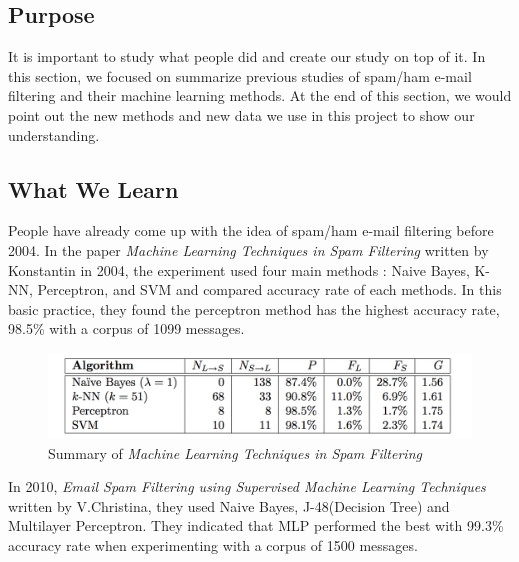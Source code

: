 
\subsection{Purpose}

It is important to study what people did and create our study on top of it. In this section, we focused on summarize previous studies of spam/ham e-mail filtering and their machine learning methods. At the end of this section, we would point out the new methods and new data we use in this project to show our understanding.  \\

\subsection{What We Learn}
People have already come up with the idea of spam/ham e-mail filtering before 2004. In the paper \textit{Machine Learning Techniques in Spam Filtering} written by Konstantin in 2004\cite{MLinspam}, the experiment used four main methods : Naive Bayes, K-NN, Perceptron, and SVM and compared accuracy rate of each methods. In this basic practice, they found the perceptron method has the highest accuracy rate, 98.5\% with a corpus of 1099 messages. \\

\begin{figure}[H]
	\centering
	\includegraphics[scale=1.0, width=\linewidth]{./plots/2004.png}
	\caption{Summary of \textit{Machine Learning Techniques in Spam Filtering\cite{MLinspam}}}
	\label{paper_summary_2004}
\end{figure}

In 2010, \textit{Email Spam Filtering using Supervised Machine Learning Techniques } written by V.Christina\cite{EmailMLT}, they used Naive Bayes, J-48(Decision Tree) and Multilayer Perceptron. They indicated that MLP performed the best with 99.3\% accuracy rate when experimenting with a corpus of 1500 messages.\\

